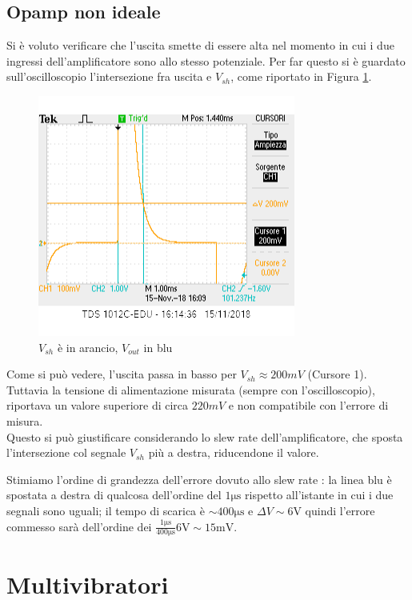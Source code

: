 \documentclass[10pt,a4paper]{article}
\begin{document}
\subsection{Opamp non ideale}
	Si è voluto verificare che l'uscita smette di essere alta nel momento in cui i due ingressi dell'amplificatore sono allo stesso potenziale. Per far questo si è guardato sull'oscilloscopio l'intersezione fra uscita e $V_{sh}$, come riportato in Figura \ref{220mv}.
\begin{figure} \centering
	\includegraphics[scale=0.9]{220mv_2.png}
		\caption{$V_{sh}$ è in arancio, $V_{out}$ in blu}
	\label{220mv}

\end{figure}
Come si può vedere, l'uscita passa in basso per $V_{sh}\approx200mV$ (Cursore 1). Tuttavia la tensione di alimentazione misurata (sempre con l'oscilloscopio), riportava un valore superiore di circa $220mV$ e non compatibile con l'errore di misura.\\ Questo si può giustificare considerando lo slew rate dell'amplificatore, che sposta l'intersezione col segnale $V_{sh} $ più a destra, riducendone il valore.

Stimiamo l'ordine di grandezza dell'errore dovuto allo slew rate :  la linea blu è spostata a destra di qualcosa dell'ordine del $1\si{\micro\second}$ rispetto all'istante in cui i due segnali sono uguali; il tempo di scarica è $\sim 400\si{\micro\second}$ e $\Delta V \sim 6 \si{\volt} $ quindi l'errore commesso sarà dell'ordine dei $ \frac{1\si{\micro\second}}{400\si{\micro\second}} 6 \si \volt \sim 15 \si{\milli \volt}$.
\section{ Multivibratori }
\end{document}
